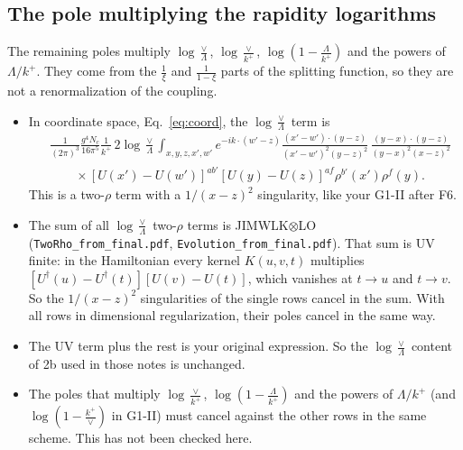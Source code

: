 \documentclass[10pt]{article}
\numberwithin{equation}{section}
\begin{document}
\subsection{The pole multiplying the rapidity logarithms}\label{sec:rap}
The remaining poles multiply $\log\frac\vee\Lambda$, $\log\frac\vee{k^+}$, $\log(1-\frac\Lambda{k^+})$ and the powers of $\Lambda/k^+$. They come from the $\frac1\xi$ and $\frac{1}{1-\xi}$ parts of the splitting function, so they are not a renormalization of the coupling.
\begin{itemize}
\item In coordinate space, Eq.~\eqref{eq:coord}, the $\log\frac\vee\Lambda$ term is
\begin{align*}
&\frac{1}{(2\pi)^3}\frac{g^4N_c}{16\pi^5}\frac{1}{k^+}\,2\log\frac\vee\Lambda\int_{x,y,z,x',w'}e^{-ik\cdot(w'-z)}\frac{(x'-w')\cdot(y-z)}{(x'-w')^2(y-z)^2}\,\frac{(y-x)\cdot(y-z)}{(y-x)^2(x-z)^2}\\
&\qquad\times[U(x')-U(w')]^{ab'}[U(y)-U(z)]^{af}\rho^{b'}(x')\rho^f(y).
\end{align*}
This is a two-$\rho$ term with a $1/(x-z)^2$ singularity, like your G1-II after F6.
\item The sum of all $\log\frac\vee\Lambda$ two-$\rho$ terms is JIMWLK$\otimes$LO (\texttt{TwoRho\_from\_final.pdf}, \texttt{Evolution\_from\_final.pdf}). That sum is UV finite: in the Hamiltonian every kernel $K(u,v,t)$ multiplies $[U^\dagger(u)-U^\dagger(t)][U(v)-U(t)]$, which vanishes at $t\to u$ and $t\to v$. So the $1/(x-z)^2$ singularities of the single rows cancel in the sum. With all rows in dimensional regularization, their poles cancel in the same way.
\item The UV term plus the rest is your original expression. So the $\log\frac\vee\Lambda$ content of 2b used in those notes is unchanged.
\item The poles that multiply $\log\frac\vee{k^+}$, $\log(1-\frac\Lambda{k^+})$ and the powers of $\Lambda/k^+$ (and $\log(1-\frac{k^+}\vee)$ in G1-II) must cancel against the other rows in the same scheme. This has not been checked here.
\end{itemize}

\end{document}
